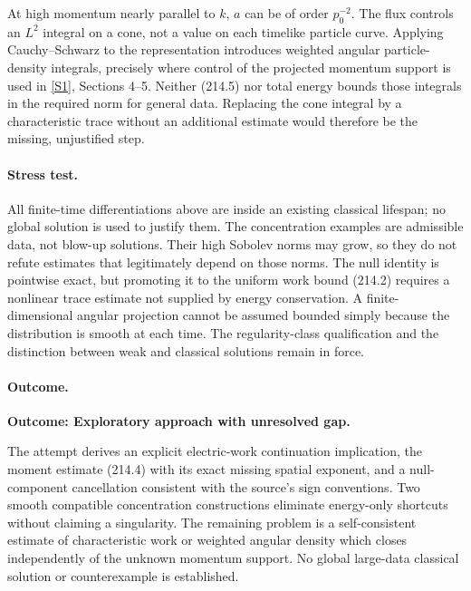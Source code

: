 \documentclass[11pt,a4paper]{article}
\newcommand{\sref}[2]{\hyperlink{source:#1:#2}{[S#2]}}
\begin{document}
At high momentum nearly parallel to $k$, $a$ can be of order $p_0^{-2}$.
The flux controls an $L^2$ integral on a cone, not a value on each timelike
particle curve. Applying Cauchy--Schwarz to the representation introduces
weighted angular particle-density integrals, precisely where control of the
projected momentum support is used in \sref{214}{1}, Sections 4--5. Neither
(214.5) nor total energy bounds those integrals in the required norm for
general data. Replacing the cone integral by a characteristic trace without
an additional estimate would therefore be the missing, unjustified step.

\paragraph{Stress test.}
All finite-time differentiations above are inside an existing classical
lifespan; no global solution is used to justify them. The concentration
examples are admissible data, not blow-up solutions. Their high Sobolev
norms may grow, so they do not refute estimates that legitimately depend on
those norms. The null identity is pointwise exact, but promoting it to the
uniform work bound (214.2) requires a nonlinear trace estimate not supplied
by energy conservation. A finite-dimensional angular projection cannot be
assumed bounded simply because the distribution is smooth at each time.
The regularity-class qualification and the distinction between weak and
classical solutions remain in force.

\paragraph{Outcome.}
\textbf{Outcome: Exploratory approach with unresolved gap.}

The attempt derives an explicit electric-work continuation implication, the
moment estimate (214.4) with its exact missing spatial exponent, and a
null-component cancellation consistent with the source's sign conventions.
Two smooth compatible concentration constructions eliminate energy-only
shortcuts without claiming a singularity. The remaining problem is a
self-consistent estimate of characteristic work or weighted angular density
which closes independently of the unknown momentum support. No global
large-data classical solution or counterexample is established.
\end{document}
